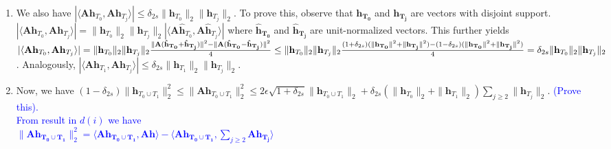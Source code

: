 \documentclass[11pt]{article}
\begin{document}
\begin{enumerate}
\begin{enumerate}
\begin{enumerate}
\textcolor{blue}{$|\langle \mathbf{Ah}_{T_0 \cup T_1} , \mathbf{Ah}\rangle| \leq \|\mathbf{Ah}_{T_0 \cup T_1}\|_2 \|\mathbf{Ah}\|_2$ (Cauchy-Schwartz Inequality)\\
From the restricted isometry property of $\mathbf{A}$ we get\\
 $ \|\mathbf{Ah}_{T_0 \cup T_1}\|_2 \leq \sqrt{1 + \delta_{2s}} \|\mathbf{h}_{T_0 \cup T_1}\|_2$\\
 From the result in $(a)$ we have\\
 $ \|\mathbf{Ah}\|_2 \leq 2\epsilon$\\
 $\therefore |\langle \mathbf{Ah}_{T_0 \cup T_1} , \mathbf{Ah}\rangle| \leq \|\mathbf{Ah}_{T_0 \cup T_1}\|_2 \|\mathbf{Ah}\|_2 \leq 2 \epsilon \sqrt{1 + \delta_{2s}} \|\mathbf{h}_{T_0 \cup T_1}\|_2$}
\item We also have $|\langle \mathbf{Ah}_{T_0}, \mathbf{Ah}_{T_j}\rangle| \leq \delta_{2s} \|\mathbf{h}_{T_0}\|_2 \|\mathbf{h}_{T_j}\|_2$. To prove this, observe that $\mathbf{h_{T_0}}$ and $\mathbf{h_{T_j}}$ are vectors with disjoint support. $|\langle \mathbf{Ah}_{T_0}, \mathbf{Ah}_{T_j}\rangle| = \|\mathbf{h}_{T_0}\|_2 \|\mathbf{h}_{T_j}\|_2|\langle \mathbf{A\hat{h}}_{T_0}, \mathbf{A\hat{h}}_{T_j}\rangle|$  where $\mathbf{\hat{h}_{T_0}}$ and $\mathbf{\hat{h}_{T_j}}$ are unit-normalized vectors. This further yields $|\langle \mathbf{Ah}_{T_0}, \mathbf{Ah}_{T_j}\rangle|=\|\mathbf{h}_{T_0}\|_2 \|\mathbf{h}_{T_j}\|_2 \frac{\|\mathbf{A}(\mathbf{\hat{h}_{T_0}}+\mathbf{\hat{h}_{T_j}})\|^2 - \|\mathbf{A}(\mathbf{\hat{h}_{T_0}}-\mathbf{\hat{h}_{T_j}})\|^2}{4} 
\\ \leq \|\mathbf{h}_{T_0}\|_2 \|\mathbf{h}_{T_j}\|_2 \frac{(1+\delta_{2s})(\|\mathbf{h_{T_0}}\|^2+\|\mathbf{h_{T_j}}\|^2)-(1-\delta_{2s})(\|\mathbf{h_{T_0}}\|^2+\|\mathbf{h_{T_j}}\|^2)}{4} \\
= \delta_{2s} \|\mathbf{h}_{T_0}\|_2 \|\mathbf{h}_{T_j}\|_2$. Analogously, $|\langle \mathbf{Ah}_{T_1}, \mathbf{Ah}_{T_j}\rangle| \leq \delta_{2s} \|\mathbf{h}_{T_1}\|_2 \|\mathbf{h}_{T_j}\|_2$. 
\item Now, we have $(1-\delta_{2s})\|\mathbf{h}_{T_0 \cup T_1}\|^2_2 
\leq \|\mathbf{Ah}_{T_0 \cup T_1}\|^2_2 \leq 2 \epsilon \sqrt{1+\delta_{2s}}\|\mathbf{h}_{T_0 \cup T_1}\|_2 + \delta_{2s}(\|\mathbf{h}_{T_0}\|_2 + \|\mathbf{h}_{T_1}\|_2) \sum_{j \geq 2} \|\mathbf{h}_{T_j}\|_2$. \textcolor{blue}{(Prove this).} \\
\textcolor{blue}{From result in $d(i)$ we have\\
$\|\mathbf{Ah_{T_0 \cup T_1}}\|^2_2 = \langle \mathbf{Ah_{T_0 \cup T_1}} , \mathbf{Ah}\rangle - \langle \mathbf{Ah_{T_0 \cup T_1}} , \sum_{j \geq 2} \mathbf{Ah_{T_j}}\rangle$\\
}
\end{enumerate}
\end{enumerate}
\end{enumerate}
\end{document}
